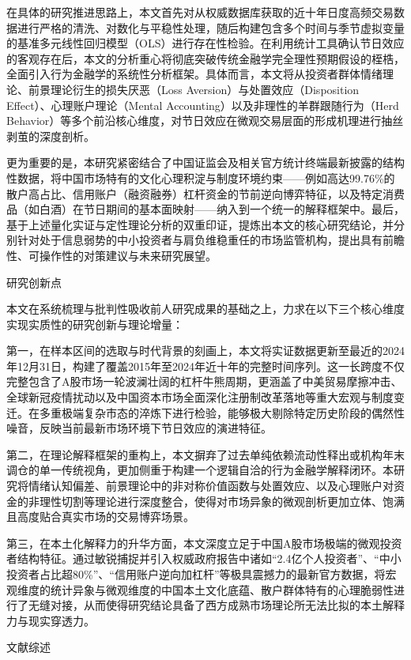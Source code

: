 \documentclass{cupb-thesis}
\begin{document}
在具体的研究推进思路上，本文首先对从权威数据库获取的近十年日度高频交易数据进行严格的清洗、对数化与平稳性处理，随后构建包含多个时间与季节虚拟变量的基准多元线性回归模型（OLS）进行存在性检验。在利用统计工具确认节日效应的客观存在后，本文的分析重心将彻底突破传统金融学完全理性预期假设的桎梏，全面引入行为金融学的系统性分析框架。具体而言，本文将从投资者群体情绪理论、前景理论衍生的损失厌恶（Loss Aversion）与处置效应（Disposition Effect）、心理账户理论（Mental Accounting）以及非理性的羊群跟随行为（Herd Behavior）等多个前沿核心维度，对节日效应在微观交易层面的形成机理进行抽丝剥茧的深度剖析。


更为重要的是，本研究紧密结合了中国证监会及相关官方统计终端最新披露的结构性数据，将中国市场特有的文化心理积淀与制度环境约束——例如高达99.76\%的散户高占比、信用账户（融资融券）杠杆资金的节前逆向博弈特征，以及特定消费品（如白酒）在节日期间的基本面映射——纳入到一个统一的解释框架中。最后，基于上述量化实证与定性理论分析的双重印证，提炼出本文的核心研究结论，并分别针对处于信息弱势的中小投资者与肩负维稳重任的市场监管机构，提出具有前瞻性、可操作性的对策建议与未来研究展望。


研究创新点

本文在系统梳理与批判性吸收前人研究成果的基础之上，力求在以下三个核心维度实现实质性的研究创新与理论增量：

第一，在样本区间的选取与时代背景的刻画上，本文将实证数据更新至最近的2024年12月31日，构建了覆盖2015年至2024年近十年的完整时间序列。这一长跨度不仅完整包含了A股市场一轮波澜壮阔的杠杆牛熊周期，更涵盖了中美贸易摩擦冲击、全球新冠疫情扰动以及中国资本市场全面深化注册制改革落地等重大宏观与制度变迁。在多重极端复杂市态的淬炼下进行检验，能够极大剔除特定历史阶段的偶然性噪音，反映当前最新市场环境下节日效应的演进特征。

第二，在理论解释框架的重构上，本文摒弃了过去单纯依赖流动性释出或机构年末调仓的单一传统视角，更加侧重于构建一个逻辑自洽的行为金融学解释闭环。本研究将情绪认知偏差、前景理论中的非对称价值函数与处置效应、以及心理账户对资金的非理性切割等理论进行深度整合，使得对市场异象的微观剖析更加立体、饱满且高度贴合真实市场的交易博弈场景。

第三，在本土化解释力的升华方面，本文深度立足于中国A股市场极端的微观投资者结构特征。通过敏锐捕捉并引入权威政府报告中诸如“2.4亿个人投资者”、“中小投资者占比超80\%”、“信用账户逆向加杠杆”等极具震撼力的最新官方数据，将宏观维度的统计异象与微观维度的中国本土文化底蕴、散户群体特有的心理脆弱性进行了无缝对接，从而使得研究结论具备了西方成熟市场理论所无法比拟的本土解释力与现实穿透力。


文献综述
\end{document}
